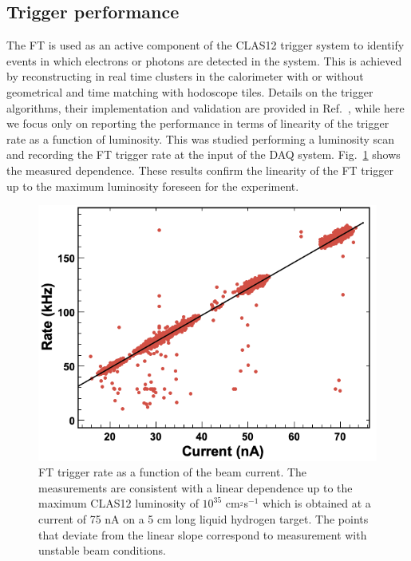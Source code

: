 \subsection{Trigger performance}
The FT is used as an active component of the CLAS12 trigger system to identify events in which electrons or photons are detected in the system. This is achieved by reconstructing in real time clusters in the calorimeter with or without geometrical and time matching with hodoscope tiles. Details on the trigger algorithms, their implementation and validation are provided in Ref.~\cite{trigger}, while here we focus only on reporting the performance in terms of  linearity of the trigger rate as a function of luminosity. This was studied performing a luminosity scan and recording the FT trigger rate at the input of the DAQ system. Fig.~\ref{fig:trigger_rate} shows the measured dependence. These results confirm the linearity of the FT trigger up to the maximum luminosity foreseen for the experiment.
\begin{figure}[h]
\includegraphics[height=0.68\columnwidth]{fig/ft_trigger.png}
\caption{FT trigger rate as a function of the beam current. The measurements are consistent with a linear dependence up to the maximum CLAS12 luminosity of $10^{35}$ cm$^{_2}$s$^{-1}$ which is obtained at a current of 75 nA on a 5 cm long liquid hydrogen target. The points that deviate from the linear slope correspond to measurement with unstable beam conditions.}
\label{fig:trigger_rate}
\end{figure}

